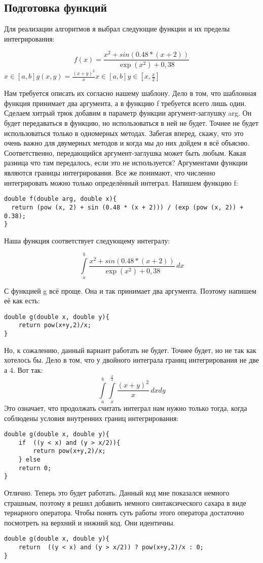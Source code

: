 \documentclass{article}
\begin{document}
\subsection{Подготовка функций}
Для реализации алгоритмов я выбрал следующие функции и их пределы интегрирования:
\begin{center}
$$f(x) = \frac{x^2 + sin (0.48 * (x + 2))}{\exp(x^2)+0,38} $$
$x \in [a,b]$$

$$g(x,y) = \frac{(x+y)^2}{x}$$ 
$$x \in [a,b]$$
$$y \in [x,\frac{x}{2}] $

\end{center}
Нам требуется описать их согласно нашему шаблону. Дело в том, что шаблонная функция
принимает два аргумента, а в функцию f требуется всего лишь один. Сделаем хитрый трюк
добавим в параметр функции аргумент-заглушку arg. Он будет передаваться в функцию, но использоваться в ней не будет. Точнее не будет использоваться только в одномерных методах. Забегая вперед, скажу, что это очень важно для двумерных методов и когда мы до них дойдем я всё объясню. Соответственно, передающийся аргумент-заглушка может быть любым. Какая разница что там передалось, если это не используется? Аргументами функции являются границы интегрирования. Все же понимают, что численно интегрировать можно только определённый интеграл. 
Напишем функцию f:
\begin{lstlisting}
double f(double arg, double x){
  return (pow (x, 2) + sin (0.48 * (x + 2))) / (exp (pow (x, 2)) + 0.38);
}
\end{lstlisting}
Наша функция соответствует следующему интегралу:
\begin{center}
$$\int\limits_a^b \frac{x^2 + sin (0.48 * (x + 2))}{\exp(x^2)+0,38}\,dx$$
\end{center}
С функцией g всё проще. Она и так принимает два аргумента. Поэтому напишем её как есть:
\begin{lstlisting}
double g(double x, double y){
    return pow(x+y,2)/x;
}
\end{lstlisting}
Но, к сожалению, данный вариант работать не будет. Точнее будет, но не так как хотелось бы. Дело в том, что у двойного интеграла границ интегрирования не две а 4.
Вот так:
$$\int\limits_a^b \int\limits_x^\frac{x}{2} \frac{(x+y)^2}{x}\,dxdy$$
Это означает, что продолжать считать интеграл нам нужно только тогда, когда соблюдены условия внутренних границ интегрирования:
\begin{lstlisting}
double g(double x, double y){
    if  ((y < x) and (y > x/2)){
        return pow(x+y,2)/x;
    } else 
    return 0;
}
\end{lstlisting}
Отлично. Теперь это будет работать. Данный код мне показался немного страшным, поэтому я решил добавить немного синтаксического сахара в виде тернарного оператора. Чтобы понять суть работы этого оператора достаточно посмотреть на верхний и нижний код. Они идентичны.
\begin{lstlisting}
double g(double x, double y){
    return  ((y < x) and (y > x/2)) ? pow(x+y,2)/x : 0;
}
\end{lstlisting}
\end{document}
